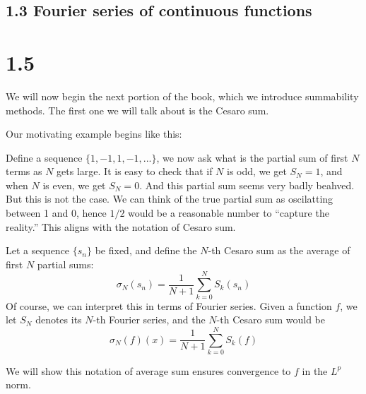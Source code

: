 \subsection{1.3 Fourier series of continuous functions}

\section{1.5}

We will now begin the next portion of the book, which we introduce summability methods. The first one we will talk about is the Cesaro sum.

Our motivating example begins like this:
\begin{example}
    Define a sequence $\{1, -1, 1, -1, ...\}$, we now ask what is the partial sum of first $N$ terms as $N$ gets large. It is easy to check that if $N$ is odd, we get $S_N=1$, and when $N$ is even, we get $S_N=0$. And this partial sum seems very badly beahved. But this is not the case. We can think of the true partial sum as oscilatting between 1 and 0, hence $1/2$ would be a reasonable number to ``capture the reality.'' This aligns with the notation of Cesaro sum.
\end{example}

\begin{definition}
    Let a sequence $\{s_n\}$ be fixed, and define the $N$-th Cesaro sum as the average of first $N$ partial sums:
    \begin{equation*}
        \sigma_N(s_n)=\frac{1}{N+1}\sum_{k=0}^{N}S_k(s_n)
    \end{equation*} 
    Of course, we can interpret this in terms of Fourier series. Given a function $f$, we let $S_N$ denotes its $N$-th Fourier series, and the $N$-th Cesaro sum would be
    \begin{equation*}
        \sigma_N(f)(x)=\frac{1}{N+1}\sum_{k=0}^NS_k(f)
    \end{equation*}
\end{definition}

We will show this notation of average sum ensures convergence to $f$ in the $L^p$ norm.

